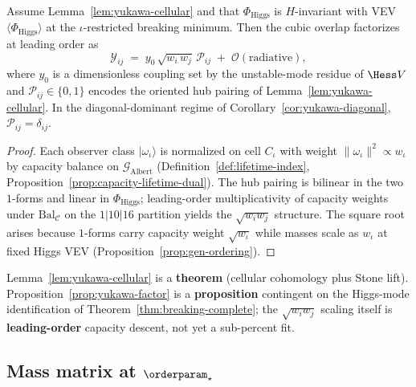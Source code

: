 \begin{proposition}\label{prop:yukawa-factor}
Assume Lemma~\ref{lem:yukawa-cellular} and that $\Phi_{\mathrm{Higgs}}$ is
$H$-invariant with VEV $\langle\Phi_{\mathrm{Higgs}}\rangle$ at the
$\iota$-restricted breaking minimum. Then the cubic overlap factorizes at
leading order as
\begin{equation}\label{eq:yukawa-factor}
  \mathcal{Y}_{ij}
  \;=\;
  y_0\,\sqrt{w_i\,w_j}\,\mathcal{P}_{ij}
  \;+\;\mathcal{O}(\text{radiative}),
\end{equation}
where $y_0$ is a dimensionless coupling set by the unstable-mode residue of
$\Hess V$ and $\mathcal{P}_{ij}\in\{0,1\}$ encodes the oriented hub pairing
of Lemma~\ref{lem:yukawa-cellular}. In the diagonal-dominant regime of
Corollary~\ref{cor:yukawa-diagonal}, $\mathcal{P}_{ij}=\delta_{ij}$.
\end{proposition}

\begin{proof}
Each observer class $|\omega_\iota\rangle$ is normalized on cell $C_\iota$ with
weight $\|{\omega_\iota}\|^2\propto w_\iota$ by capacity balance on
$\mathcal{G}_{\mathrm{Albert}}$ (Definition~\ref{def:lifetime-index},
Proposition~\ref{prop:capacity-lifetime-dual}). The hub pairing is bilinear
in the two $1$-forms and linear in $\Phi_{\mathrm{Higgs}}$; leading-order
multiplicativity of capacity weights under $\mathrm{Bal}_{\mathcal{C}}$ on
the $1|10|16$ partition yields the $\sqrt{w_i w_j}$ structure. The square
root arises because $1$-forms carry capacity weight $\sqrt{w_\iota}$ while
masses scale as $w_\iota$ at fixed Higgs VEV
(Proposition~\ref{prop:gen-ordering}).
\end{proof}

\begin{remark}
Lemma~\ref{lem:yukawa-cellular} is a \textbf{theorem} (cellular cohomology
plus Stone lift). Proposition~\ref{prop:yukawa-factor} is a
\textbf{proposition} contingent on the Higgs-mode identification of
Theorem~\ref{thm:breaking-complete}; the $\sqrt{w_i w_j}$ scaling itself is
\textbf{leading-order} capacity descent, not yet a sub-percent fit.
\end{remark}

\subsection{Mass matrix at $\orderparam_\star$}
\label{sec:yukawa:mass-matrix}

